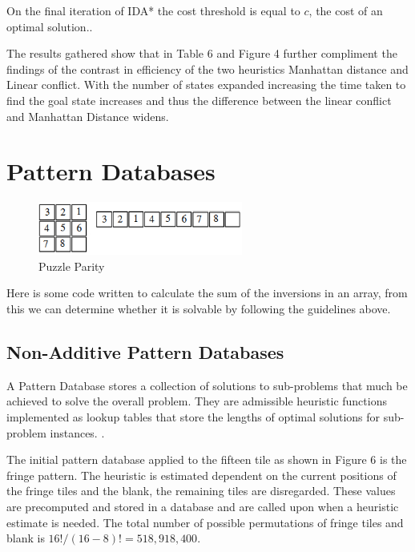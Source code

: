 \documentclass[final]{cmpreport}
\begin{document}
On the final iteration of IDA* the cost threshold is equal to $c$, the cost of an optimal solution.\citep{DBLP:journals/ai/KorfRE01}.

The results gathered show that in Table 6 and Figure 4 further compliment the findings of the contrast in efficiency of the two heuristics Manhattan distance and Linear conflict. With the number of states expanded increasing the time taken to find the goal state increases and thus the difference between the linear conflict and Manhattan Distance widens.


\section{Pattern Databases}




\begin{figure}[ht]
	\centering
	\includegraphics[width=0.6\textwidth]{parity}
	\captionsetup{justification=centering}
	\caption{Puzzle Parity}
\end{figure}

Here is some code written to calculate the sum of the inversions in an array, from this we can determine whether it is solvable by following the guidelines above.


\subsection{Non-Additive Pattern Databases}
A Pattern Database stores a collection of solutions to sub-problems that much be achieved to solve the overall problem. They are admissible heuristic functions implemented as lookup tables that store the lengths of optimal solutions for sub-problem instances. \citep{DBLP:journals/jair/FelnerKMH07}.

The initial pattern database applied to the fifteen tile as shown in Figure 6 is the fringe pattern. The heuristic is estimated dependent on the current positions of the fringe tiles and the blank, the remaining tiles are disregarded. These values are precomputed and stored in a database and are called upon when a heuristic estimate is needed. The total number of possible permutations of fringe tiles and blank is $16!/(16-8)!=518,918,400$. 
\end{document}
